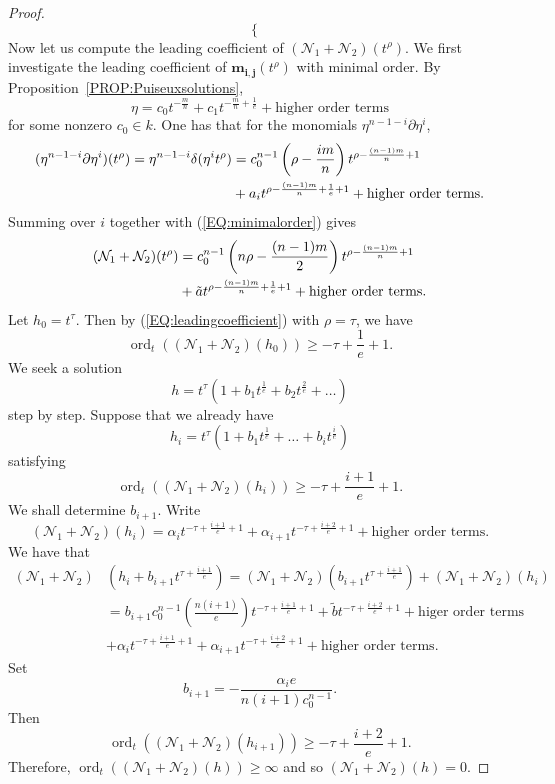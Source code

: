 \documentclass{article}
\DeclareMathOperator{\ord}{ord}
\newcommand{\bfm} { {\mathbf{m}}}
\newcommand{\bfi} { {\mathbf{i}}}
\newcommand{\bfj} { {\mathbf{j}}}
\newcommand{\calN}{{\mathcal{N}}}
\begin{document}
\begin{proof}
\begin{equation}
\begin{cases}
      \end{cases}
\end{equation}
Now let us compute the leading coefficient of $(\calN_1+\calN_2)(t^\rho)$. We first investigate the leading coefficient of $\bfm_{\bfi,\bfj}(t^\rho)$ with minimal order.  
By Proposition~\ref{PROP:Puiseuxsolutions}, 
$$\eta=c_0t^{-\frac{m}{n}}+c_1t^{-\frac{m}{n}+\frac{1}{e}}+\text{higher order terms}$$ 
for some nonzero $c_0\in k$. One has that for the monomials $ \eta^{n-1-i}\partial \eta^{i}$,
\begin{align*}
   (\eta^{n-1-i}\partial \eta^{i})(t^\rho)=\eta^{n-1-i}\delta(\eta^{i}t^\rho)&=c_0^{n-1}\left(\rho-\frac{i m}{n}\right)t^{\rho-\frac{(n-1)m}{n}+1}\\ \notag
&+a_{i}t^{\rho-\frac{(n-1)m}{n}+\frac{1}{e}+1}+\text{higher order terms}.
\end{align*}
Summing over $i$ together with (\ref{EQ:minimalorder}) gives 
\begin{align}
\label{EQ:leadingcoefficient}
    (\calN_1+\calN_2)(t^\rho)&=c_0^{n-1}\left(n\rho-\frac{(n-1)m}{2}\right)t^{\rho-\frac{(n-1)m}{n}+1}\\ \notag
&+\tilde{a}t^{\rho-\frac{(n-1)m}{n}+\frac{1}{e}+1}+\text{higher order terms}.
\end{align}
Let $h_0=t^{\tau}$. Then by (\ref{EQ:leadingcoefficient}) with $\rho=\tau$, we have 
$$
  \ord_t((\calN_1+\calN_2)(h_0))\geq -\tau+\frac{1}{e}+1.
$$
We seek a solution 
$$
   h=t^\tau(1+b_1t^{\frac{1}{e}}+b_2t^{\frac{2}{e}}+\dots)
$$
step by step. Suppose that we already have
$$
    h_i=t^{\tau}(1+b_1t^{\frac{1}{e}}+\dots+b_it^{\frac{i}{e}})
$$
satisfying
$$
  \ord_t((\calN_1+\calN_2)(h_i))\geq -\tau+\frac{i+1}{e}+1.
$$
We shall determine $b_{i+1}$. Write 
$$
    (\calN_1+\calN_2)(h_{i})=\alpha_{i}t^{-\tau+\frac{i+1}{e}+1}+\alpha_{i+1} t^{-\tau+\frac{i+2}{e}+1}+\text{higher order terms}.
$$
We have that  
\begin{align*}
  (\calN_1+\calN_2)&(h_i+b_{i+1}t^{\tau+\frac{i+1}{e}})=(\calN_1+\calN_2)(b_{i+1}t^{\tau+\frac{i+1}{e}})+(\calN_1+\calN_2)(h_i)\\
&=b_{i+1}c_0^{n-1}\left(\frac{n(i+1)}{e}\right)t^{-\tau+\frac{i+1}{e}+1}
+\tilde{b}t^{-\tau+\frac{i+2}{e}+1}+\text{higer order terms}\\
&+\alpha_{i}t^{-\tau+\frac{i+1}{e}+1}+\alpha_{i+1} t^{-\tau+\frac{i+2}{e}+1}+\text{higher order terms}.
\end{align*}
Set 
$$
 b_{i+1}=-\frac{\alpha_{i}e}{n(i+1) c_0^{n-1}}.
$$
Then 
$$
   \ord_t((\calN_1+\calN_2)(h_{i+1}))\geq -\tau+\frac{i+2}{e}+1.
$$
Therefore, $ \ord_t((\calN_1+\calN_2)(h))\geq \infty$ and so $(\calN_1+\calN_2)(h)=0$.
\end{proof}
\end{document}
